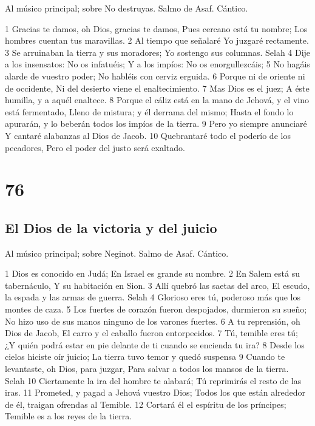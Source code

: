 Al músico principal; sobre No destruyas. Salmo de Asaf. Cántico.

1 Gracias te damos, oh Dios, gracias te damos,
Pues cercano está tu nombre;
Los hombres cuentan tus maravillas.
2 Al tiempo que señalaré
Yo juzgaré rectamente.
3 Se arruinaban la tierra y sus moradores;
Yo sostengo sus columnas. Selah
4 Dije a los insensatos: No os infatuéis;
Y a los impíos: No os enorgullezcáis;
5 No hagáis alarde de vuestro poder;
No habléis con cerviz erguida.
6 Porque ni de oriente ni de occidente,
Ni del desierto viene el enaltecimiento.
7 Mas Dios es el juez;
A éste humilla, y a aquél enaltece.
8 Porque el cáliz está en la mano de Jehová, y el vino está fermentado,
Lleno de mistura; y él derrama del mismo;
Hasta el fondo lo apurarán, y lo beberán todos los impíos de la tierra.
9 Pero yo siempre anunciaré
Y cantaré alabanzas al Dios de Jacob.
10 Quebrantaré todo el poderío de los pecadores,
Pero el poder del justo será exaltado.

\chapter{76}

\section*{El Dios de la victoria y del juicio}

Al músico principal; sobre Neginot. Salmo de Asaf. Cántico.

1 Dios es conocido en Judá;
En Israel es grande su nombre.
2 En Salem está su tabernáculo,
Y su habitación en Sion.
3 Allí quebró las saetas del arco,
El escudo, la espada y las armas de guerra. Selah
4 Glorioso eres tú, poderoso más que los montes de caza.
5 Los fuertes de corazón fueron despojados, durmieron su sueño;
No hizo uso de sus manos ninguno de los varones fuertes.
6 A tu reprensión, oh Dios de Jacob,
El carro y el caballo fueron entorpecidos.
7 Tú, temible eres tú;
¿Y quién podrá estar en pie delante de ti cuando se encienda tu ira?
8 Desde los cielos hiciste oír juicio;
La tierra tuvo temor y quedó suspensa
9 Cuando te levantaste, oh Dios, para juzgar,
Para salvar a todos los mansos de la tierra. Selah
10 Ciertamente la ira del hombre te alabará;
Tú reprimirás el resto de las iras.
11 Prometed, y pagad a Jehová vuestro Dios;
Todos los que están alrededor de él, traigan ofrendas al Temible.
12 Cortará él el espíritu de los príncipes;
Temible es a los reyes de la tierra.

